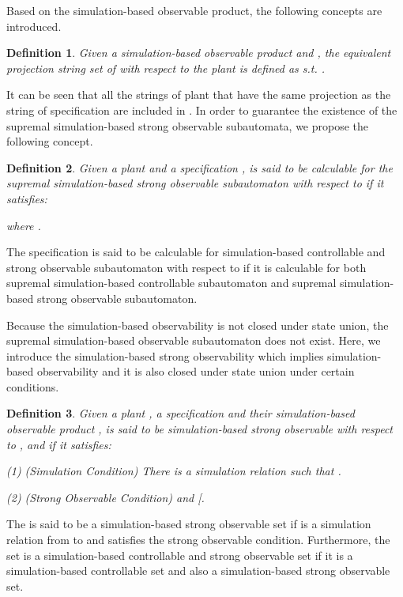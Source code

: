 \documentclass[12pt,draftcls,onecolumn]{IEEEtran}
\newtheorem{Definition}{Definition}
\begin{document}
Based on the simulation-based observable product, the following
concepts are introduced.

\begin{Definition}
Given a simulation-based observable product  and , the equivalent projection string set
of  with respect to the plant  is defined as
 s.t.
.
\end{Definition}

It can be seen that all the strings of plant  that have the same
projection as the string  of specification are included in
. In order to guarantee the existence of the supremal
simulation-based strong observable subautomata, we propose the
following concept.

\begin{Definition}
Given a plant  and a specification
,  is said to be calculable
for the supremal simulation-based strong observable subautomaton
with respect to  if it satisfies:

where .
\end{Definition}

The specification  is said to be calculable for
simulation-based controllable and strong observable subautomaton
with respect to  if it is calculable for both supremal
simulation-based controllable subautomaton and supremal
simulation-based strong observable subautomaton.

Because the simulation-based observability is not closed under
state union, the supremal simulation-based observable subautomaton
does not exist. Here, we introduce the simulation-based strong
observability which implies simulation-based observability and it
is also closed under state union under certain conditions.
\begin{Definition}
Given a plant , a specification
 and their simulation-based
observable product ,  is said to be
simulation-based strong observable with respect to ,
 and  if it satisfies:

(1) (Simulation Condition) There is a simulation relation 
such that .

(2) (Strong Observable Condition)  and  
[.
\end{Definition}

The  is said to be a
simulation-based strong observable set if  is a
simulation relation from  to  and 
satisfies the strong observable condition. Furthermore, the set
 is a simulation-based controllable and strong
observable set if it is a simulation-based controllable set and
also a simulation-based strong observable set.
\end{document}
